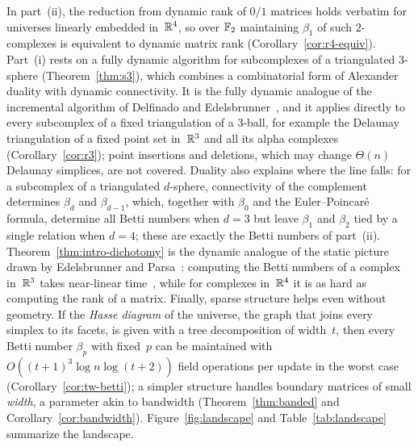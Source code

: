 In part~(ii), the reduction from dynamic rank of $0/1$ matrices holds verbatim for universes linearly embedded in~$\mathbb{R}^4$, so over $\mathbb{F}_2$ maintaining $\beta_1$ of such $2$-complexes is equivalent to dynamic matrix rank (Corollary~\ref{cor:r4-equiv}).
Part~(i) rests on a fully dynamic algorithm for subcomplexes of a triangulated $3$-sphere (Theorem~\ref{thm:s3}), which combines a combinatorial form of Alexander duality with dynamic connectivity.
It is the fully dynamic analogue of the incremental algorithm of Delfinado and Edelsbrunner~\cite{DE95}, and it applies directly to every subcomplex of a fixed triangulation of a $3$-ball, for example the Delaunay triangulation of a fixed point set in~$\mathbb{R}^3$ and all its alpha complexes (Corollary~\ref{cor:r3}); point insertions and deletions, which may change $\Theta(n)$ Delaunay simplices, are not covered.
Duality also explains where the line falls: for a subcomplex of a triangulated $d$-sphere, connectivity of the complement determines $\beta_d$ and $\beta_{d-1}$, which, together with $\beta_0$ and the Euler--Poincar\'e formula, determine all Betti numbers when $d=3$ but leave $\beta_1$ and $\beta_2$ tied by a single relation when $d=4$; these are exactly the Betti numbers of part~(ii).
Theorem~\ref{thm:intro-dichotomy} is the dynamic analogue of the static picture drawn by Edelsbrunner and Parsa~\cite{EP14}: computing the Betti numbers of a complex in~$\mathbb{R}^3$ takes near-linear time~\cite{DE95,DG98}, while for complexes in~$\mathbb{R}^4$ it is as hard as computing the rank of a matrix.
Finally, sparse structure helps even without geometry.
If the \emph{Hasse diagram} of the universe, the graph that joins every simplex to its facets, is given with a tree decomposition of width~$t$, then every Betti number $\beta_p$ with fixed~$p$ can be maintained with \mbox{$O((t+1)^3\log n\log(t+2))$} field operations per update in the worst case (Corollary~\ref{cor:tw-betti}); a simpler structure handles boundary matrices of small \emph{width}, a parameter akin to bandwidth (Theorem~\ref{thm:banded} and Corollary~\ref{cor:bandwidth}).
Figure~\ref{fig:landscape} and Table~\ref{tab:landscape} summarize the landscape.



